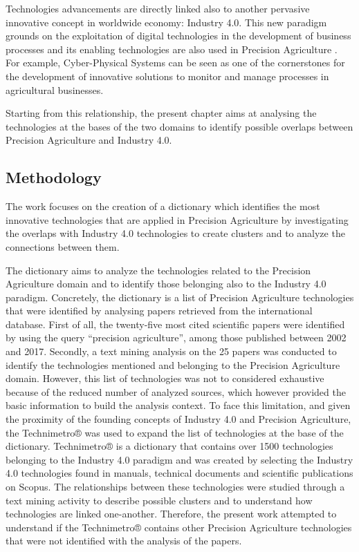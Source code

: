 \documentclass[b5paper,]{book}
\theoremstyle{definition}
\theoremstyle{definition}
\theoremstyle{definition}
\theoremstyle{remark}
\begin{document}
Technologies advancements are directly linked also to another pervasive
innovative concept in worldwide economy: Industry 4.0. This new paradigm
grounds on the exploitation of digital technologies in the development
of business processes and its enabling technologies are also used in
Precision Agriculture . For example, Cyber-Physical Systems can be seen
as one of the cornerstones for the development of innovative solutions
to monitor and manage processes in agricultural businesses.

Starting from this relationship, the present chapter aims at analysing
the technologies at the bases of the two domains to identify possible
overlaps between Precision Agriculture and Industry 4.0.

\subsection{Methodology}\label{methodology-5}

The work focuses on the creation of a dictionary which identifies the
most innovative technologies that are applied in Precision Agriculture
by investigating the overlaps with Industry 4.0 technologies to create
clusters and to analyze the connections between them.

The dictionary aims to analyze the technologies related to the Precision
Agriculture domain and to identify those belonging also to the Industry
4.0 paradigm. Concretely, the dictionary is a list of Precision
Agriculture technologies that were identified by analysing papers
retrieved from the international database. First of all, the twenty-five
most cited scientific papers were identified by using the query
``precision agriculture'', among those published between 2002 and 2017.
Secondly, a text mining analysis on the 25 papers was conducted to
identify the technologies mentioned and belonging to the Precision
Agriculture domain. However, this list of technologies was not to
considered exhaustive because of the reduced number of analyzed sources,
which however provided the basic information to build the analysis
context. To face this limitation, and given the proximity of the
founding concepts of Industry 4.0 and Precision Agriculture, the
Technimetro® was used to expand the list of technologies at the base of
the dictionary. Technimetro® \citep{chiarello2018extracting} is a
dictionary that contains over 1500 technologies belonging to the
Industry 4.0 paradigm and was created by selecting the Industry 4.0
technologies found in manuals, technical documents and scientific
publications on Scopus. The relationships between these technologies
were studied through a text mining activity to describe possible
clusters and to understand how technologies are linked one-another.
Therefore, the present work attempted to understand if the Technimetro®
contains other Precision Agriculture technologies that were not
identified with the analysis of the papers.
\end{document}
